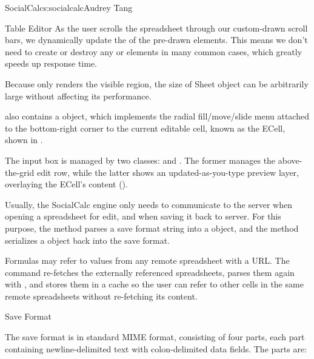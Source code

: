 \begin{aosachapter}{SocialCalc}{s:socialcalc}{Audrey Tang}
\begin{aosasect1}{Table Editor}
As the user scrolls the spreadsheet through our custom-drawn scroll
bars, we dynamically update the  of the pre-drawn
 elements.  This means we don't need to
create or destroy any  or
 elements in many common cases,
which greatly speeds up response time.

Because  only renders the visible region, the size
of Sheet object can be arbitrarily large without affecting its
performance.

 also contains a  object, which
implements the radial fill/move/slide menu attached to the
bottom-right corner to the current editable cell, known as the ECell,
shown in .


The input box is managed by two classes:  and
.  The former manages the above-the-grid edit row,
while the latter shows an updated-as-you-type preview layer,
overlaying the ECell's content ().


Usually, the SocialCalc engine only needs to communicate to the server
when opening a spreadsheet for edit, and when saving it back to
server.  For this purpose, the  method
parses a save format string into a  object, and the
 method serializes a  object
back into the save format.

Formulas may refer to values from any remote spreadsheet with a URL.
The  command re-fetches the externally referenced
spreadsheets, parses them again with , and
stores them in a cache so the user can refer to other cells in the
same remote spreadsheets without re-fetching its content.

\end{aosasect1}

\begin{aosasect1}{Save Format}

The save format is in standard MIME  format,
consisting of four  parts, each part
containing newline-delimited text with colon-delimited data fields.
The parts are:


\end{aosasect1}
\end{aosachapter}
